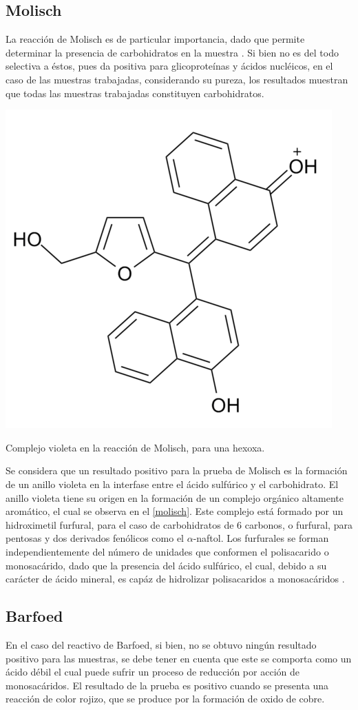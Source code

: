 \documentclass[fleqn,10pt]{SelfArx}
\begin{document}
	\subsection{Molisch}
		La reacci\'on de Molisch es de particular importancia, dado que permite determinar la presencia de carbohidratos en la muestra \cite{blanco2017gustavo}. Si bien no es del todo selectiva a \'estos, pues da positiva para glicoprote\'inas y \'acidos nucl\'eicos, en el caso de las muestras trabajadas, considerando su pureza, los resultados muestran que todas las muestras trabajadas constituyen carbohidratos.
		\begin{scheme}[h]
			\centering
			\includegraphics[width = 0.5\linewidth]{molisch}
			\caption{Complejo violeta en la reacci\'on de Molisch, para una hexoxa.}
			\label{molisch}
		\end{scheme}
	
		Se considera que un resultado positivo para la prueba de Molisch es la formaci\'on de un anillo violeta en la interfase entre el \'acido sulf\'urico y el carbohidrato. El anillo violeta tiene su origen en la formaci\'on de un complejo org\'anico altamente arom\'atico, el cual se observa en el \autoref{molisch}. Este complejo est\'a formado por un hidroximetil furfural, para el caso de carbohidratos de 6 carbonos, o furfural, para pentosas y dos derivados fen\'olicos como el $\alpha$-naftol. Los furfurales se forman independientemente del n\'umero de unidades que conformen el polisacarido o monosac\'arido, dado que la presencia del \'acido sulf\'urico, el cual, debido a su car\'acter de \'acido mineral, es cap\'az de hidrolizar polisacaridos a monosac\'aridos \cite{harisha2005introduction}.	
		
	\subsection{Barfoed}
		En el caso del reactivo de Barfoed, si bien, no se obtuvo ning\'un resultado positivo para las muestras, se debe tener en cuenta que este se comporta como un ácido débil el cual puede sufrir un proceso de reducción por acción de monosacáridos. El resultado de la prueba es positivo cuando se presenta una reacción de color rojizo, que se produce por la formación de oxido de cobre.
	
\end{document}
